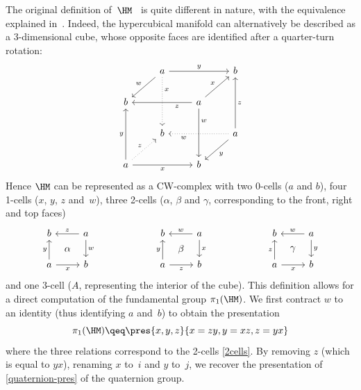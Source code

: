 \documentclass[a4paper]{article}
\newcommand{\citep}{\cite}
\begin{document}
The original definition of~$\HM$~\cite[p. 66, section 13, troisième exemple]{poincare1895analysis} is quite different in nature, with the equivalence explained in~\citep{hypercubique}. Indeed, the hypercubical manifold can alternatively be described as a 3-dimensional cube, whose opposite faces are identified after a quarter-turn rotation:
\begin{equation}
  \label{hm}
  \begin{tikzcd}
    &\ar[dl,"w"']a\ar[dd,dotted,"x",near start]\ar[rr,"y"]&&b\\
    b&&\ar[ll,"z",near start]a\ar[dd,"w",near start]\ar[ur,"x"]\\
    &b&&\ar[ll,dotted,"w",near end]\ar[dl,"y"]a\ar[uu,"z"']\\
    a\ar[uu,"y"]\ar[ur,dotted,"z"]\ar[rr,"x"']&&b
  \end{tikzcd}
\end{equation}
Hence $\HM$ can be represented as a CW-complex with two 0-cells ($a$ and $b$), four 1-cells ($x$, $y$, $z$ and~$w$), three 2-cells ($\alpha$, $\beta$ and $\gamma$, corresponding to the front, right and top faces)
\begin{equation}
  \label{2cells}
  \begin{tikzcd}
    b\ar[dr,phantom,"\alpha"]&\ar[l,"z"']a\ar[d,"w"]\\
    a\ar[u,"y"]\ar[r,"x"']&b
  \end{tikzcd}
  \qquad\qquad\qquad
  \begin{tikzcd}
    b\ar[dr,phantom,"\beta"]&\ar[l,"w"']a\ar[d,"x"]\\
    a\ar[u,"y"]\ar[r,"z"']&b
  \end{tikzcd}
  \qquad\qquad\qquad
  \begin{tikzcd}
    b\ar[dr,phantom,"\gamma"]&\ar[l,"w"']a\ar[d,"y"]\\
    a\ar[u,"z"]\ar[r,"x"']&b
  \end{tikzcd}
\end{equation}
and one 3-cell ($A$, representing the interior of the cube).
%
This definition allows for a direct computation of the fundamental group $\pi_1(\HM)$. We first contract $w$ to an identity (thus identifying $a$ and~$b$) to obtain the presentation
\[
  \pi_1(\HM)
  \qeq
  \pres{x,y,z}{x=zy,y=xz,z=yx}
\]
where the three relations correspond to the 2-cells \cref{2cells}. By removing $z$ (which is equal to $yx$), renaming $x$ to~$i$ and $y$ to~$j$, we recover the presentation of \cref{quaternion-pres} of the quaternion group.
\end{document}
